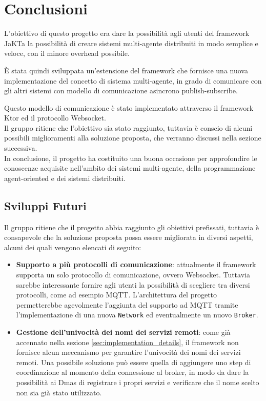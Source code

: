 \section{Conclusioni}
L'obiettivo di questo progetto era dare la possibilità agli utenti del framework JaKTa la possibilità di creare sistemi multi-agente distribuiti in modo semplice e veloce, 
con il minore overhead possibile.

È stata quindi sviluppata un'estensione del framework che fornisce una nuova implementazione del concetto di sistema multi-agente, in grado di comunicare con gli altri sistemi
con modello di comunicazione asincrono publish-subscribe.

Questo modello di comunicazione è stato implementato attraverso il framework Ktor ed il protocollo Websocket. \\

Il gruppo ritiene che l'obiettivo sia stato raggiunto, tuttavia è conscio di alcuni possibili miglioramenti alla soluzione proposta, che verranno discussi nella sezione successiva.\\

In conclusione, il progetto ha costituito una buona occasione per approfondire le conoscenze acquisite nell'ambito dei sistemi multi-agente, della programmazione agent-oriented e dei sistemi distribuiti.


\subsection{Sviluppi Futuri}
Il gruppo ritiene che il progetto abbia raggiunto gli obiettivi prefissati, tuttavia è consapevole che la soluzione proposta possa essere migliorata in diversi aspetti, 
alcuni dei quali vengono elencati di seguito:

\begin{itemize}
    \item \textbf{Supporto a più protocolli di comunicazione}: attualmente il framework supporta un solo protocollo di comunicazione, ovvero Websocket. Tuttavia sarebbe interessante
    fornire agli utenti la possibilità di scegliere tra diversi protocolli, come ad esempio MQTT. L'architettura del progetto permetterebbe agevolmente l'aggiunta del supporto ad MQTT
    tramite l'implementazione di una nuova \texttt{Network} ed eventualmente un nuovo \texttt{Broker}.
    \item \textbf{Gestione dell'univocità dei nomi dei servizi remoti}: come già accennato nella sezione \ref{sec:implementation_details}, il framework non fornisce alcun meccanismo per garantire
    l'univocità dei nomi dei servizi remoti. Una possibile soluzione può essere quella di aggiungere uno step di coordinazione al momento della connessione al broker, in modo da dare la possibilità ai
    Dmas di registrare i propri servizi e verificare che il nome scelto non sia già stato utilizzato.
\end{itemize}
